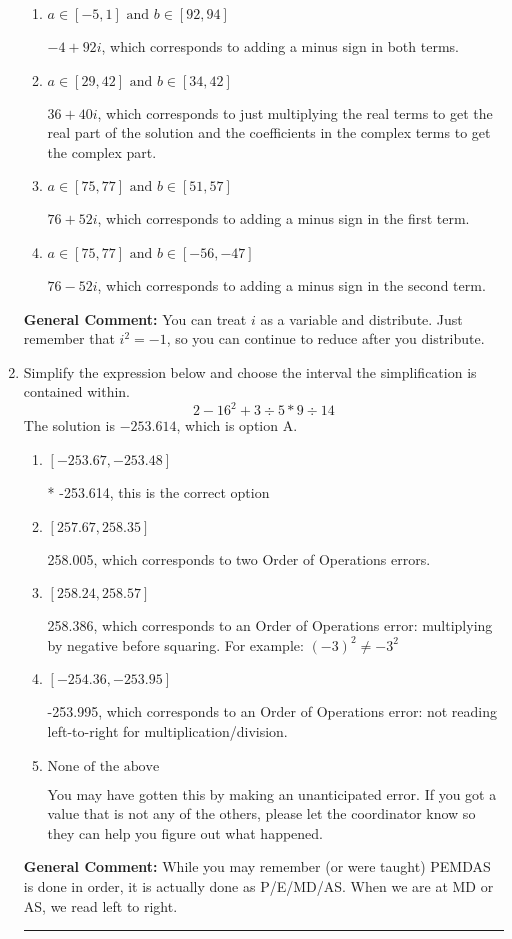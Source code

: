 \documentclass{extbook}[14pt]
\newcommand{\litem}[1]{\item #1

\rule{\textwidth}{0.4pt}}
\begin{document}
\begin{enumerate}
{\begin{enumerate}[label=\Alph*.]
* $-4 - 92 i$, which is the correct option.
\item \( a \in [-5, 1] \text{ and } b \in [92, 94] \)

 $-4 + 92 i$, which corresponds to adding a minus sign in both terms.
\item \( a \in [29, 42] \text{ and } b \in [34, 42] \)

 $36 + 40 i$, which corresponds to just multiplying the real terms to get the real part of the solution and the coefficients in the complex terms to get the complex part.
\item \( a \in [75, 77] \text{ and } b \in [51, 57] \)

 $76 + 52 i$, which corresponds to adding a minus sign in the first term.
\item \( a \in [75, 77] \text{ and } b \in [-56, -47] \)

 $76 - 52 i$, which corresponds to adding a minus sign in the second term.
\end{enumerate}

\textbf{General Comment:} You can treat $i$ as a variable and distribute. Just remember that $i^2=-1$, so you can continue to reduce after you distribute.
}
\litem{
Simplify the expression below and choose the interval the simplification is contained within.
\[ 2 - 16^2 + 3 \div 5 * 9 \div 14 \]The solution is \( -253.614 \), which is option A.\begin{enumerate}[label=\Alph*.]
\item \( [-253.67, -253.48] \)

* -253.614, this is the correct option
\item \( [257.67, 258.35] \)

 258.005, which corresponds to two Order of Operations errors.
\item \( [258.24, 258.57] \)

 258.386, which corresponds to an Order of Operations error: multiplying by negative before squaring. For example: $(-3)^2 \neq -3^2$
\item \( [-254.36, -253.95] \)

 -253.995, which corresponds to an Order of Operations error: not reading left-to-right for multiplication/division.
\item \( \text{None of the above} \)

 You may have gotten this by making an unanticipated error. If you got a value that is not any of the others, please let the coordinator know so they can help you figure out what happened.
\end{enumerate}

\textbf{General Comment:} While you may remember (or were taught) PEMDAS is done in order, it is actually done as P/E/MD/AS. When we are at MD or AS, we read left to right.
}
\end{enumerate}
\end{document}
